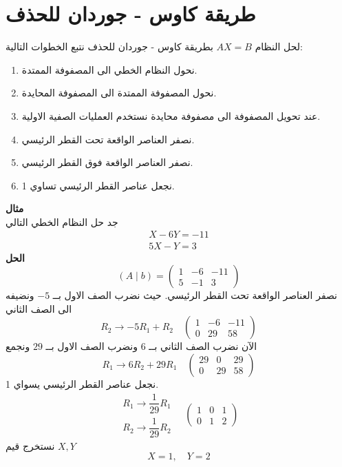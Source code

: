 \section[طريقة كاوس - جوردان للحذف]{طريقة كاوس - جوردان للحذف}

لحل النظام $AX=B$ بطريقة كاوس - جوردان للحذف نتبع الخطوات التالية:
\begin{enumerate}[leftmargin=*]
	\item نحول النظام الخطي الى المصفوفة الممتدة.
	\item نحول المصفوفة الممتدة الى المصفوفة المحايدة.
	\item عند تحويل المصفوفة الى مصفوفة محايدة نستخدم العمليات الصفية الاولية.
	\item نصفر العناصر الواقعة تحت القطر الرئيسي.
	\item نصفر العناصر الواقعة فوق القطر الرئيسي.
	\item نجعل عناصر القطر الرئيسي تساوي 1.
\end{enumerate}

\noindent
\textbf{مثال}\\ \noindent
جد حل النظام الخطي التالي
\begin{align*}
	X-6Y = -11\\
	5X - Y = 3
\end{align*}
\textbf{الحل}
\[
(A\mid b) =
\left(
\begin{array}{cc|c}
	1&-6&-11\\
	5&-1&3
\end{array}
\right)
\]
نصفر العناصر الواقعة تحت القطر الرئيسي. حيث نضرب الصف الاول بــ $-5$ ونضيفه الى الصف الثاني
\[
R_2\to-5R_1 + R_2  \quad 
\left(
\begin{array}{cc|c}
	1&-6&-11\\
	0&29&58
\end{array}
\right)
\]
الآن نضرب الصف الثاني بــ $6$ ونضرب الصف الاول بــ $29$ ونجمع
\[
R_1 \to 6R_2 + 29R_1 \quad
\left(
\begin{array}{cc|c}
	29&0&29\\
	0&29&58
\end{array}
\right) 
\]
نجعل عناصر القطر الرئيسي يسواي 1.
\[
\begin{array}{c}
	R_1 \to \dfrac{1}{29}R_1\\[10pt]
	R_2 \to \dfrac{1}{29}R_2
\end{array}\quad
\left(
\begin{array}{cc|c}
	1&0&1\\
	0&1&2
\end{array}
\right) 
\]
نستخرج قيم $X, Y$ 
\[
X=1, \quad Y=2 
\]
